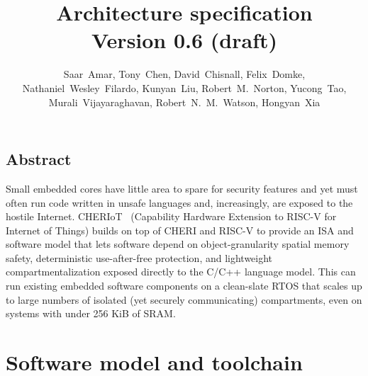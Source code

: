 \documentclass[12pt,letterpaper,twoside,openright,fleqn]{report}
\begin{document}
\title{\cherimcu{} Architecture specification\\
  Version 0.6 (draft)}
\author{
  \parbox{\linewidth}{\centering%
    Saar~Amar,
    Tony~Chen,
    David~Chisnall,
    Felix~Domke,
    Nathaniel~Wesley~Filardo,
    Kunyan~Liu,
    Robert~M.~Norton,
    Yucong~Tao,
    Murali~Vijayaraghavan,
    Robert~N.~M.~Watson,
    Hongyan~Xia
  }%
}

\begin{minipage}[h]{\textwidth}
  \vspace{-.2cm}
  \maketitle
\end{minipage}

\normalsize


\clearpage

\chapter*{Abstract}

Small embedded cores have little area to spare for security features and yet must often run code written in unsafe languages and, increasingly, are exposed to the hostile Internet.
CHERIoT  (Capability Hardware Extension to RISC-V for Internet of Things) builds on top of CHERI and RISC-V to provide an ISA and software model that lets software depend on object-granularity spatial memory safety, deterministic use-after-free protection, and lightweight compartmentalization exposed directly to the C/C++ language model.
This can run existing embedded software components on a clean-slate RTOS that scales up to large numbers of isolated (yet securely communicating) compartments, even on systems with under 256 KiB of SRAM.

\clearpage



\clearpage



\clearpage



\clearpage

\tableofcontents

\part{Software model and toolchain}
\label{part:sw}
\end{document}
